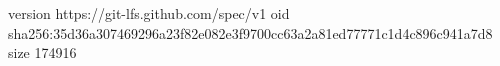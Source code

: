 version https://git-lfs.github.com/spec/v1
oid sha256:35d36a307469296a23f82e082e3f9700cc63a2a81ed77771c1d4c896c941a7d8
size 174916

